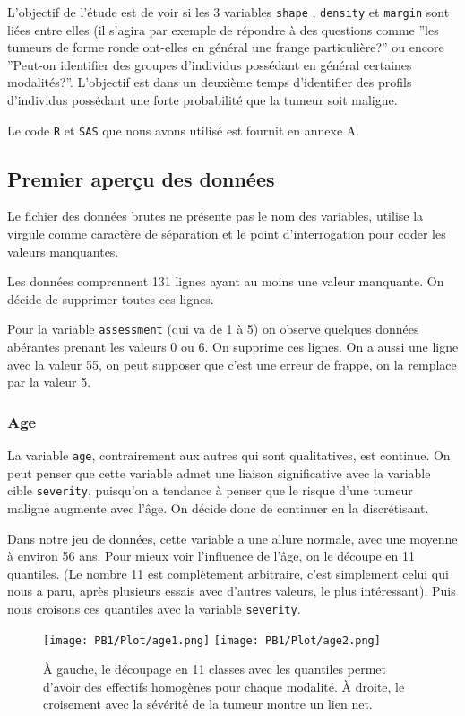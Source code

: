 \documentclass[a4paper]{report}
\begin{document}
L'objectif de l'étude est de voir si les 3 variables \verb|shape| , \verb|density| et \verb|margin| sont liées entre elles (il s'agira par exemple de répondre à des questions comme ''les tumeurs de forme ronde ont-elles en général une frange particulière?'' ou encore ''Peut-on identifier des groupes d'individus possédant en général certaines modalités?''. L'objectif est dans un deuxième temps d'identifier des profils d'individus possédant une forte probabilité que la tumeur soit maligne. 

Le code \verb|R| et \verb|SAS| que nous avons utilisé est fournit en annexe A.

\subsection{Premier aperçu des données}
Le fichier des données brutes ne présente pas le nom des variables, utilise la virgule comme caractère de séparation et le point d'interrogation pour coder les valeurs manquantes. 

Les données comprennent 131 lignes ayant au moins une valeur manquante. On décide de supprimer toutes ces lignes.

Pour la variable \verb|assessment| (qui va de 1 à 5) on observe quelques données abérantes prenant les valeurs 0 ou 6. On supprime ces lignes. On a aussi une ligne avec la valeur 55, on peut supposer que c'est une erreur de frappe, on la remplace par la valeur 5.

\subsubsection{Age}

La variable \verb|age|, contrairement aux autres qui sont qualitatives, est continue. On peut penser que cette variable admet une liaison significative avec la variable cible \verb|severity|, puisqu'on a tendance à penser que le risque d'une tumeur maligne augmente avec l'âge. On décide donc de continuer en la discrétisant.

Dans notre jeu de données, cette variable a une allure normale, avec une moyenne à environ 56 ans. Pour mieux voir l'influence de l'âge, on le découpe en 11 quantiles. (Le nombre 11 est complètement arbitraire, c'est simplement celui qui nous a paru, après plusieurs essais avec d'autres valeurs, le plus intéressant). Puis nous croisons ces quantiles avec la variable \verb|severity|. 

\begin{figure}[!ht]
	\centering
     	\texttt{[image: PB1/Plot/age1.png]} 
       	\texttt{[image: PB1/Plot/age2.png]} 
       	\caption{À gauche, le découpage en 11 classes avec les quantiles permet d'avoir des effectifs homogènes pour chaque modalité. À droite, le croisement avec la sévérité de la tumeur montre un lien net.} 
\end{figure}
\end{document}
